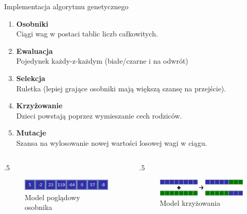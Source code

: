\begin{frame}[noframenumbering]{Implementacja algorytmu genetycznego}
    \begin{enumerate}
        \item \textbf{Osobniki} \\
        {\small Ciągi wag w postaci tablic liczb całkowitych.}
        \item \textbf{Ewaluacja} \\
        {\small Pojedynek każdy-z-każdym (białe/czarne i na odwrót)}
        \item \textbf{Selekcja} \\
        {\small Ruletka (lepiej grające osobniki mają większą szansę na przejście).}
        \item \textbf{Krzyżowanie} \\
        {\small Dzieci powstają poprzez wymieszanie cech rodziców.}
        \item \textbf{Mutacje} \\
        {\small Szansa na wylosowanie nowej wartości losowej wagi w ciągu.}
    \end{enumerate}

    \begin{columns}
		\begin{column}{.5\hsize}
			{\centering
			\begin{figure}
				\includegraphics[width=5cm]{figures/genetyk_osobnik.png}
				\caption{Model poglądowy osobnika}
			\end{figure}
			}
		\end{column}
		\begin{column}{.5\hsize}
			{\centering
			\begin{figure}
				\includegraphics[width=5cm]{figures/genetyk_krzyzowanie.png}
				\caption{Model krzyżowania}
			\end{figure}
			}
		\end{column}
	\end{columns}
\end{frame}
